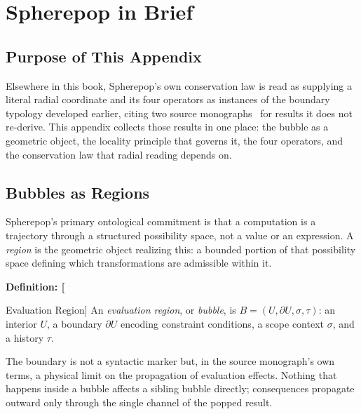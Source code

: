 \documentclass[11pt,fleqn]{book}
\numberwithin{equation}{chapter}
\newenvironment{definition}[1]
  {\begin{definitionEnv}
   \noindent\textbf{Definition: #1}\par\smallskip}
  {\end{definitionEnv}}
\theoremstyle{plain}
\theoremstyle{definition}
\theoremstyle{remark}
\begin{document}

\chapter{Spherepop in Brief}

\section{Purpose of This Appendix}

Elsewhere in this book, Spherepop's own conservation law is read as supplying a literal radial coordinate and its four operators as instances of the boundary typology developed earlier, citing two source monographs~\cite{spherepop-geometry,spherepop-histories} for results it does not re-derive. This appendix collects those results in one place: the bubble as a geometric object, the locality principle that governs it, the four operators, and the conservation law that radial reading depends on.

\section{Bubbles as Regions}

Spherepop's primary ontological commitment is that a computation is a trajectory through a structured possibility space, not a value or an expression. A \emph{region} is the geometric object realizing this: a bounded portion of that possibility space defining which transformations are admissible within it.

\begin{definition}[Evaluation Region]
An \emph{evaluation region}, or \emph{bubble}, is \(B=(U,\partial U,\sigma,\tau)\): an interior \(U\), a boundary \(\partial U\) encoding constraint conditions, a scope context \(\sigma\), and a history \(\tau\).
\end{definition}

The boundary is not a syntactic marker but, in the source monograph's own terms, a physical limit on the propagation of evaluation effects. Nothing that happens inside a bubble affects a sibling bubble directly; consequences propagate outward only through the single channel of the popped result.
\end{document}

